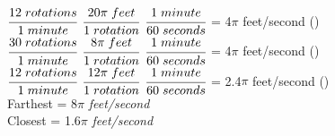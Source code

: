 \documentclass[a4paper]{article}
\begin{document}
\begin{itemize}
       $\cfrac{12 \hspace{1mm}rotations}{1 \hspace{1mm} minute}$ \times \hspace{1mm} $\cfrac{20\pi \hspace{1mm}feet}{1 \hspace{1mm}rotation}$ \times \hspace{1mm} $\cfrac{1 \hspace{1mm}minute}{60 \hspace{1mm}seconds}$ = 4$\pi$ \hspace{1mm}feet/second \hspace{3mm} () \vspace{3mm}
       \\
       \newline
       $\cfrac{30 \hspace{1mm}rotations}{1 \hspace{1mm} minute}$ \times \hspace{1mm} $\cfrac{8\pi \hspace{1mm}feet}{1 \hspace{1mm}rotation}$ \times \hspace{1mm} $\cfrac{1 \hspace{1mm}minute}{60 \hspace{1mm}seconds}$ = 4$\pi$ \hspace{1mm}feet/second \hspace{3mm} () \vspace{3mm}
       \\
       \newline
       $\cfrac{12 \hspace{1mm}rotations}{1 \hspace{1mm} minute}$ \times \hspace{1mm} $\cfrac{12\pi \hspace{1mm}feet}{1 \hspace{1mm}rotation}$ \times \hspace{1mm} $\cfrac{1 \hspace{1mm}minute}{60 \hspace{1mm}seconds}$ = 2.4$\pi$ \hspace{1mm}feet/second \hspace{3mm} () \vspace{6mm}
       \\
       \newline
       Farthest = 8$\pi$ \hspace{1mm}\emph{feet/second} 
       \\
       \newline
       Closest = 1.6$\pi$ \hspace{1mm}\emph{feet/second} 
       \\

\end{itemize} \vspace{3mm}
\end{document}
